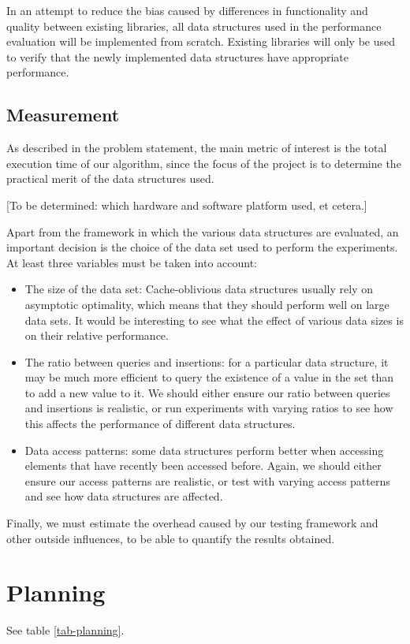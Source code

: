 \documentclass{acm_proc_article-sp}
\begin{document}
In an attempt to reduce the bias caused by differences in functionality and quality between existing libraries, all data structures used in the performance evaluation will be implemented from scratch. Existing libraries will only be used to verify that the newly implemented data structures have appropriate performance.

\subsection{Measurement}
As described in the problem statement, the main metric of interest is the total execution time of our algorithm, since the focus of the project is to determine the practical merit of the data structures used.

[To be determined: which hardware and software platform used, et cetera.]

Apart from the framework in which the various data structures are evaluated, an important decision is the choice of the data set used to perform the experiments. At least three variables must be taken into account:
\begin{itemize}
\item The size of the data set: Cache-oblivious data structures usually rely on asymptotic optimality, which means that they should perform well on large data sets. It would be interesting to see what the effect of various data sizes is on their relative performance.
\item The ratio between queries and insertions: for a particular data structure, it may be much more efficient to query the existence of a value in the set than to add a new value to it. We should either ensure our ratio between queries and insertions is realistic, or run experiments with varying ratios to see how this affects the performance of different data structures.
\item Data access patterns: some data structures perform better when accessing elements that have recently been accessed before. Again, we should either ensure our access patterns are realistic, or test with varying access patterns and see how data structures are affected.
\end{itemize}

Finally, we must estimate the overhead caused by our testing framework and other outside influences, to be able to quantify the results obtained.

\section{Planning}
See table \ref{tab-planning}.
\end{document}
